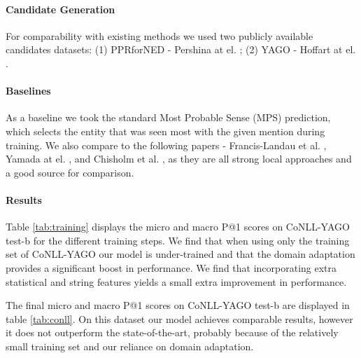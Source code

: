 \documentclass[11pt,letterpaper]{article}
\begin{document}
	\paragraph{Candidate Generation}
	For comparability with existing methods we used two publicly available candidates datasets: (1) PPRforNED - Pershina at el. ;
	(2) YAGO - Hoffart at el. .
	
	\paragraph{Baselines}
	As a baseline we took the standard Most Probable Sense (MPS) prediction, which selects the entity that was seen most with the given mention during training.
	We also compare to the following papers - Francis-Landau et al. ,  Yamada at el. , and Chisholm et al. , as they are all strong local approaches and a good source for comparison.
	
	
	\paragraph{Results}
	Table \ref{tab:training} displays the micro and macro P@1 scores on CoNLL-YAGO test-b for the different training steps. We find that when using only the training set of CoNLL-YAGO our model is under-trained and that the domain adaptation provides a significant boost in performance. We find that incorporating extra statistical and string features yields a small extra improvement in performance.
	
	The final micro and macro P@1 scores on CoNLL-YAGO test-b are displayed in table \ref{tab:conll}. On this dataset our model achieves comparable results, however it does not outperform the state-of-the-art, probably because of the relatively small training set and our reliance on domain adaptation.
	
\end{document}
